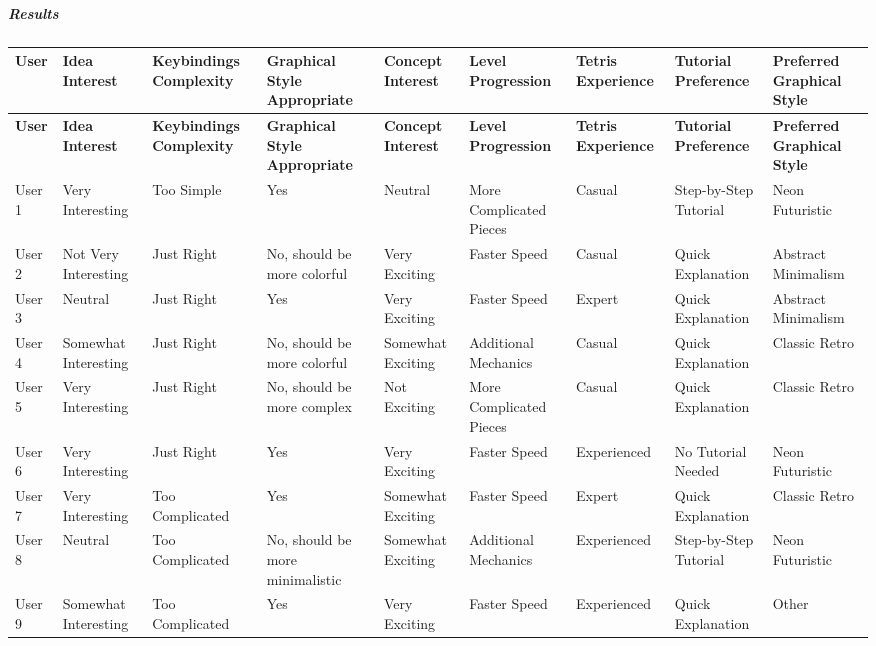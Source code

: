 \documentclass{article}
\begin{document}
\begin{landscape}
    \subparagraph{Results}
    \begingroup\tiny 
        \begin{longtable}{lllllllll}
            \toprule
            \textbf{User} & \textbf{Idea Interest} & \textbf{Keybindings Complexity} & \textbf{Graphical Style Appropriate} & \textbf{Concept Interest} & \textbf{Level Progression} & \textbf{Tetris Experience} & \textbf{Tutorial Preference} & \textbf{Preferred Graphical Style} \\
            \midrule
            \endfirsthead
            \toprule
            \textbf{User} & \textbf{Idea Interest} & \textbf{Keybindings Complexity} & \textbf{Graphical Style Appropriate} & \textbf{Concept Interest} & \textbf{Level Progression} & \textbf{Tetris Experience} & \textbf{Tutorial Preference} & \textbf{Preferred Graphical Style} \\
            \midrule
            \endhead
            User 1 & Very Interesting & Too Simple & Yes & Neutral & More Complicated Pieces & Casual & Step-by-Step Tutorial & Neon Futuristic \\
            User 2 & Not Very Interesting & Just Right & No, should be more colorful & Very Exciting & Faster Speed & Casual & Quick Explanation & Abstract Minimalism \\
            User 3 & Neutral & Just Right & Yes & Very Exciting & Faster Speed & Expert & Quick Explanation & Abstract Minimalism \\
            User 4 & Somewhat Interesting & Just Right & No, should be more colorful & Somewhat Exciting & Additional Mechanics & Casual & Quick Explanation & Classic Retro \\
            User 5 & Very Interesting & Just Right & No, should be more complex & Not Exciting & More Complicated Pieces & Casual & Quick Explanation & Classic Retro \\
            User 6 & Very Interesting & Just Right & Yes & Very Exciting & Faster Speed & Experienced & No Tutorial Needed & Neon Futuristic \\
            User 7 & Very Interesting & Too Complicated & Yes & Somewhat Exciting & Faster Speed & Expert & Quick Explanation & Classic Retro \\
            User 8 & Neutral & Too Complicated & No, should be more minimalistic & Somewhat Exciting & Additional Mechanics & Experienced & Step-by-Step Tutorial & Neon Futuristic \\
            User 9 & Somewhat Interesting & Too Complicated & Yes & Very Exciting & Faster Speed & Experienced & Quick Explanation & Other \\

\end{longtable}
\end{landscape}
\end{document}
